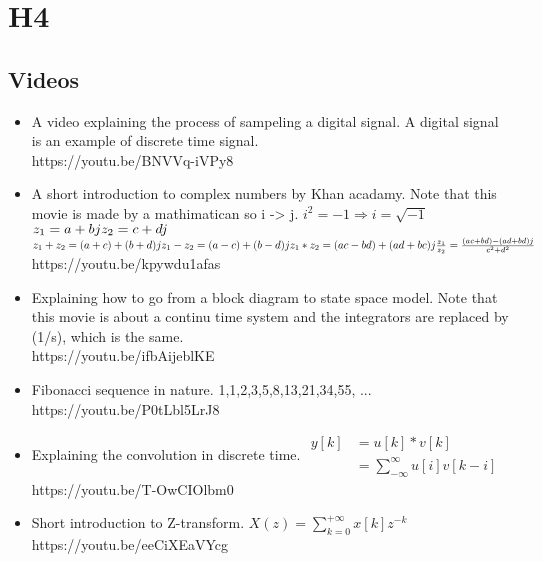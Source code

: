 \documentclass{document}
\begin{document}
		\section{H4}
		\subsection{Videos}
		\begin{itemize}
				\item A video explaining the process of sampeling a digital signal. A digital signal is an example of discrete time signal.\\
				https://youtu.be/BNVVq-iVPy8
				\item A short introduction to complex numbers by Khan acadamy. Note that this movie is made by a mathimatican so i -> j.
				$i^2 = - 1 \Rightarrow i = \sqrt{- 1}$\\
				$z_1 = a + b j\\ z_2 = c+dj$
				$z_1 + z_2 = (a+c) + (b+d)j\\ z_1 - z_2 = (a-c) + (b-d)j\\ z_1*z_2 = (ac-bd) + (ad+bc)j\\ \frac{z_1}{z_2} = \frac{(ac+bd)-(ad+bd)j}{c^2+d^2}$
				https://youtu.be/kpywdu1afas
				\item Explaining how to go from a block diagram to state space model. Note that this movie is about a continu time system and the integrators are replaced by (1/s), which is the same.\\
				https://youtu.be/ifbAijeblKE
				\item Fibonacci sequence in nature.
				1,1,2,3,5,8,13,21,34,55, ... \\https://youtu.be/P0tLbl5LrJ8
				\item Explaining the convolution in discrete time. $\begin{align} y[k]& = u[k]*v[k]\\ &= \sum_{-\infty}^{\infty} u[i]v[k-i] \end{align}$ https://youtu.be/T-OwCIOlbm0
				\item Short introduction to Z-transform. $X(z) = \sum\limits_{k=0}^{+ \infty} x[k] z^{-k}$ 
				https://youtu.be/eeCiXEaVYcg
		\end{itemize}
\end{document}
